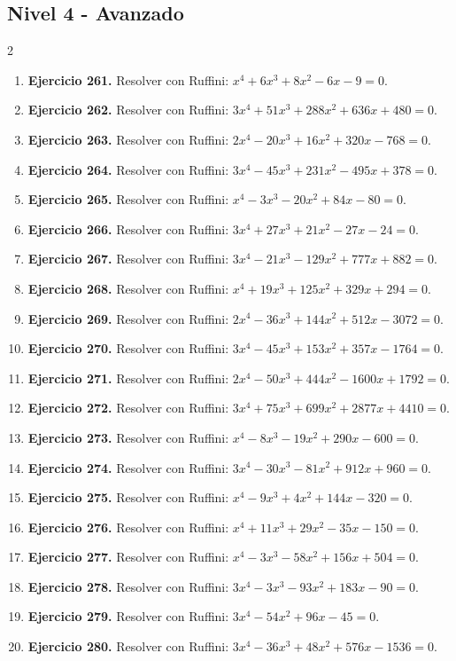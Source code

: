 \documentclass[10pt,a4paper]{article}
\newcommand{\nivel}[1]{\subsection*{#1}\addcontentsline{toc}{subsection}{#1}}
\begin{document}
\nivel{Nivel 4 - Avanzado}
\begin{multicols}{2}
\begin{enumerate}[label=\textbf{\arabic*.}]
\item \textbf{Ejercicio 261.} Resolver con Ruffini: \(x^{4} + 6 x^{3} + 8 x^{2} - 6 x - 9=0\).
\item \textbf{Ejercicio 262.} Resolver con Ruffini: \(3 x^{4} + 51 x^{3} + 288 x^{2} + 636 x + 480=0\).
\item \textbf{Ejercicio 263.} Resolver con Ruffini: \(2 x^{4} - 20 x^{3} + 16 x^{2} + 320 x - 768=0\).
\item \textbf{Ejercicio 264.} Resolver con Ruffini: \(3 x^{4} - 45 x^{3} + 231 x^{2} - 495 x + 378=0\).
\item \textbf{Ejercicio 265.} Resolver con Ruffini: \(x^{4} - 3 x^{3} - 20 x^{2} + 84 x - 80=0\).
\item \textbf{Ejercicio 266.} Resolver con Ruffini: \(3 x^{4} + 27 x^{3} + 21 x^{2} - 27 x - 24=0\).
\item \textbf{Ejercicio 267.} Resolver con Ruffini: \(3 x^{4} - 21 x^{3} - 129 x^{2} + 777 x + 882=0\).
\item \textbf{Ejercicio 268.} Resolver con Ruffini: \(x^{4} + 19 x^{3} + 125 x^{2} + 329 x + 294=0\).
\item \textbf{Ejercicio 269.} Resolver con Ruffini: \(2 x^{4} - 36 x^{3} + 144 x^{2} + 512 x - 3072=0\).
\item \textbf{Ejercicio 270.} Resolver con Ruffini: \(3 x^{4} - 45 x^{3} + 153 x^{2} + 357 x - 1764=0\).
\item \textbf{Ejercicio 271.} Resolver con Ruffini: \(2 x^{4} - 50 x^{3} + 444 x^{2} - 1600 x + 1792=0\).
\item \textbf{Ejercicio 272.} Resolver con Ruffini: \(3 x^{4} + 75 x^{3} + 699 x^{2} + 2877 x + 4410=0\).
\item \textbf{Ejercicio 273.} Resolver con Ruffini: \(x^{4} - 8 x^{3} - 19 x^{2} + 290 x - 600=0\).
\item \textbf{Ejercicio 274.} Resolver con Ruffini: \(3 x^{4} - 30 x^{3} - 81 x^{2} + 912 x + 960=0\).
\item \textbf{Ejercicio 275.} Resolver con Ruffini: \(x^{4} - 9 x^{3} + 4 x^{2} + 144 x - 320=0\).
\item \textbf{Ejercicio 276.} Resolver con Ruffini: \(x^{4} + 11 x^{3} + 29 x^{2} - 35 x - 150=0\).
\item \textbf{Ejercicio 277.} Resolver con Ruffini: \(x^{4} - 3 x^{3} - 58 x^{2} + 156 x + 504=0\).
\item \textbf{Ejercicio 278.} Resolver con Ruffini: \(3 x^{4} - 3 x^{3} - 93 x^{2} + 183 x - 90=0\).
\item \textbf{Ejercicio 279.} Resolver con Ruffini: \(3 x^{4} - 54 x^{2} + 96 x - 45=0\).
\item \textbf{Ejercicio 280.} Resolver con Ruffini: \(3 x^{4} - 36 x^{3} + 48 x^{2} + 576 x - 1536=0\).
\end{enumerate}
\end{multicols}
\end{document}
